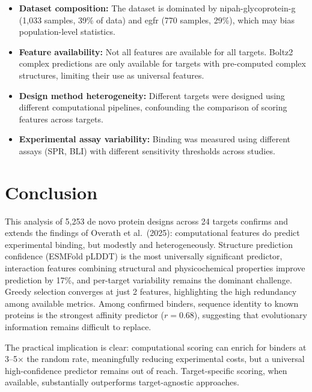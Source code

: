 \documentclass[11pt,a4paper]{article}
\begin{document}
\begin{itemize}
    \item \textbf{Dataset composition:} The dataset is dominated by nipah-glycoprotein-g (1,033 samples, 39\% of data) and egfr (770 samples, 29\%), which may bias population-level statistics.

    \item \textbf{Feature availability:} Not all features are available for all targets. Boltz2 complex predictions are only available for targets with pre-computed complex structures, limiting their use as universal features.

    \item \textbf{Design method heterogeneity:} Different targets were designed using different computational pipelines, confounding the comparison of scoring features across targets.

    \item \textbf{Experimental assay variability:} Binding was measured using different assays (SPR, BLI) with different sensitivity thresholds across studies.
\end{itemize}

\section{Conclusion}

This analysis of 5,253 de novo protein designs across 24 targets confirms and extends the findings of Overath et al.\ (2025): computational features do predict experimental binding, but modestly and heterogeneously.
Structure prediction confidence (ESMFold pLDDT) is the most universally significant predictor, interaction features combining structural and physicochemical properties improve prediction by 17\%, and per-target variability remains the dominant challenge.
Greedy selection converges at just 2 features, highlighting the high redundancy among available metrics.
Among confirmed binders, sequence identity to known proteins is the strongest affinity predictor ($r = 0.68$), suggesting that evolutionary information remains difficult to replace.

The practical implication is clear: computational scoring can enrich for binders at 3--5$\times$ the random rate, meaningfully reducing experimental costs, but a universal high-confidence predictor remains out of reach.
Target-specific scoring, when available, substantially outperforms target-agnostic approaches.
\end{document}
